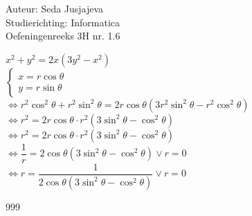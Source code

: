 \documentclass[a4paper]{article}
\begin{document}
\noindent \large Auteur: Seda Jusjajeva\\
\noindent \large Studierichting: Informatica\\
\noindent \large Oefeningenreeks 3H nr. 1.6 \\

\medskip

\normalsize

$x^2 + y^2 = 2x(3y^2 - x^2)$\\

$\left \{
	\begin{array}{l}
		x = r\cos\theta\\
		y = r\sin\theta
	\end{array}
\right .$\\

$\Leftrightarrow r^2\cos^2\theta + r^2\sin^2\theta = 2r\cos\theta(3r^2\sin^2\theta-r^2\cos^2\theta)$ \\

$\Leftrightarrow r^2 = 2r\cos\theta\cdot r^2(3\sin^2\theta - \cos^2\theta)$ \\

$\Leftrightarrow r^2 = 2r\cos\theta\cdot r^2(3\sin^2\theta - \cos^2\theta)$ \\

$\Leftrightarrow \dfrac{1}{r} = 2\cos\theta(3\sin^2\theta - \cos^2\theta) \vee r = 0$ \\

$\Leftrightarrow r = \dfrac{1}{2\cos\theta(3\sin^2\theta - \cos^2\theta)} \vee r = 0$ \\



\begin{thebibliography}{999}
\end{thebibliography}
\end{document}
